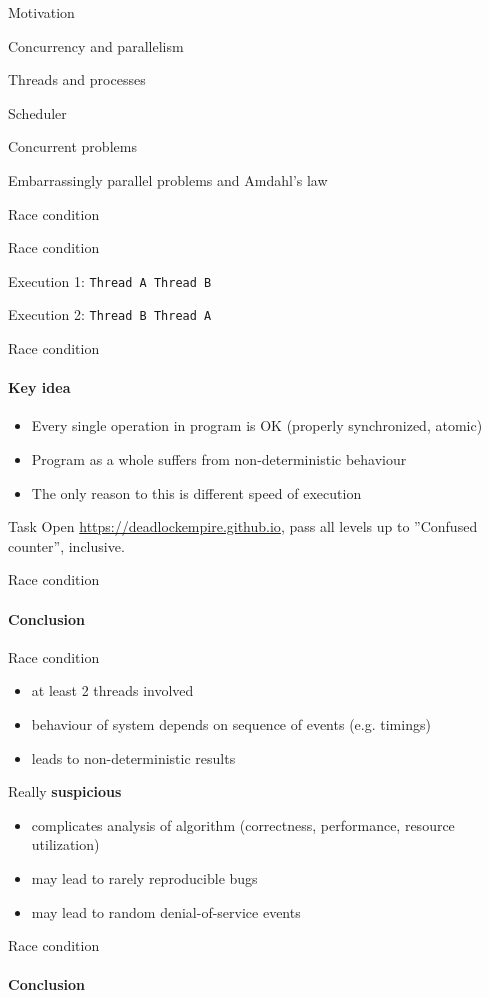 \begin{section}{Motivation}
\begin{section}{Concurrency and parallelism}
\begin{section}{Threads and processes}
\begin{section}{Scheduler}
\begin{section}{Concurrent problems}
\begin{subsection}{Embarrassingly parallel problems and Amdahl's law}
\begin{subsection}{Race condition}
\begin{frame}[fragile]{Race condition}
\pause

Execution 1: \texttt{Thread A Thread B}

Execution 2: \texttt{Thread B Thread A}

\end{frame}


\begin{frame}{Race condition}
\framesubtitle{Key idea}

\begin{itemize}
    \item Every single operation in program is OK (properly synchronized, atomic)
    \item Program as a whole suffers from non-deterministic behaviour
    \item The only reason to this is different speed of execution
\end{itemize}

\pause

\begin{homeworkmail}{Task \taskEmpire}{
    Open \url{https://deadlockempire.github.io}, pass all levels up to ''Confused counter'', inclusive.
}
\end{homeworkmail}
\end{frame}

\begin{frame}[t]{Race condition}
\framesubtitle{Conclusion}

Race condition
\begin{itemize}
    \item at least 2 threads involved
    \item behaviour of system depends on sequence of events (e.g. timings)
    \item leads to non-deterministic results
\end{itemize}

\pause 
Really \textbf{suspicious}
\begin{itemize}
    \item complicates analysis of algorithm (correctness, performance, resource utilization)
    \item may lead to rarely reproducible bugs
    \item may lead to random denial-of-service events
\end{itemize}

\end{frame}


\begin{frame}[t,noframenumbering]{Race condition}
\framesubtitle{Conclusion}


\end{frame}
\end{subsection}
\end{subsection}
\end{section}
\end{section}
\end{section}
\end{section}
\end{section}
